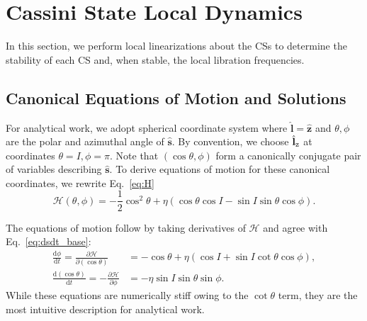 \documentclass[
        fleqn,
        usenatbib,
    ]{mnras}
\newcommand*{\rd}[2]{\frac{\mathrm{d}#1}{\mathrm{d}#2}}
\newcommand*{\pd}[2]{\frac{\partial#1}{\partial#2}}
\newcommand*{\bm}[1]{\boldsymbol{\mathbf{#1}}}
\newcommand*{\uv}[1]{\hat{\bm{#1}}}
\newcommand*{\p}[1]{\left(#1\right)}
\begin{document}



\appendix

\section{Cassini State Local Dynamics}\label{s:local_dynamics}

In this section, we perform local linearizations about the CSs to determine the
stability of each CS and, when stable, the local libration frequencies.

\subsection{Canonical Equations of Motion and Solutions}

For analytical work, we adopt spherical coordinate system where $\uv{l} =
\uv{z}$ and $\theta, \phi$ are the polar and azimuthal angle of $\uv{s}$. By
convention, we choose $\uv{l}_{\rm z}$ at coordinates $\theta = I, \phi = \pi$.
Note that $\p{\cos \theta, \phi}$ form a canonically conjugate pair of variables
describing $\uv{s}$. To derive equations of motion for these canonical
coordinates, we rewrite Eq.~\eqref{eq:H}
\begin{equation}
    \mathcal{H}\p{\theta, \phi} = -\frac{1}{2}\cos^2\theta
            + \eta \p{\cos \theta \cos I - \sin I \sin \theta \cos \phi}.
\end{equation}

The equations of motion follow by taking derivatives of $\mathcal{H}$ and agree
with Eq.~\eqref{eq:dsdt_base}:
\begin{subequations}\label{se:H_eom}
    \begin{align}
        \rd{\phi}{t} = \pd{\mathcal{H}}{(\cos\theta)}
            &= -\cos\theta + \eta\p{\cos I + \sin I \cot \theta \cos \phi},
                \label{seq:H_eom_phi_t}\\
        \rd{(\cos \theta)}{t} = -\pd{\mathcal{H}}{\phi}
            &= -\eta \sin I \sin \theta \sin \phi.
                \label{seq:H_eom_mu_t}
    \end{align}
\end{subequations}
While these equations are numerically stiff owing to the $\cot\theta$ term, they
are the most intuitive description for analytical work.
\end{document}

